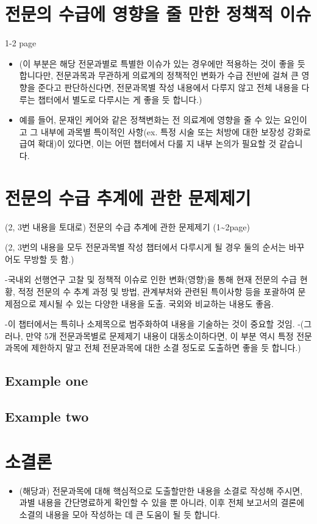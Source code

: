 \documentclass[]{book}
\providecommand{\tightlist}{%
  \setlength{\itemsep}{0pt}\setlength{\parskip}{0pt}}
\begin{document}
\hypertarget{section-7}{%
\chapter{전문의 수급에 영향을 줄 만한 정책적 이슈}\label{section-7}}

1-2 page

\begin{itemize}
\item
  (이 부분은 해당 전문과별로 특별한 이슈가 있는 경우에만 적용하는 것이 좋을 듯 합니다만, 전문과목과 무관하게 의료계의 정책적인 변화가 수급 전반에 걸쳐 큰 영향을 준다고 판단하신다면, 전문과목별 작성 내용에서 다루지 않고 전체 내용을 다루는 챕터에서 별도로 다루시는 게 좋을 듯 합니다.)
\item
  예를 들어, 문재인 케어와 같은 정책변화는 전 의료계에 영향을 줄 수 있는 요인이고 그 내부에 과목별 특이적인 사항(ex. 특정 시술 또는 처방에 대한 보장성 강화로 급여 확대)이 있다면, 이는 어떤 챕터에서 다룰 지 내부 논의가 필요할 것 같습니다.
\end{itemize}

\hypertarget{section-8}{%
\chapter{전문의 수급 추계에 관한 문제제기}\label{section-8}}

(2, 3번 내용을 토대로) 전문의 수급 추계에 관한 문제제기 (1\textasciitilde2page)

(2, 3번의 내용을 모두 전문과목별 작성 챕터에서 다루시게 될 경우 둘의 순서는 바꾸어도 무방할 듯 함.)

-국내외 선행연구 고찰 및 정책적 이슈로 인한 변화(영향)을 통해 현재 전문의 수급 현황, 적정 전문의 수 추계 과정 및 방법, 관계부처와 관련된 특이사항 등을 포괄하여 문제점으로 제시될 수 있는 다양한 내용을 도출. 국외와 비교하는 내용도 좋음.

-이 챕터에서는 특히나 소제목으로 범주화하여 내용을 기술하는 것이 중요할 것임.
-(그러나, 만약 5개 전문과목별로 문제제기 내용이 대동소이하다면, 이 부분 역시 특정 전문과목에 제한하지 말고 전체 전문과목에 대한 소결 정도로 도출하면 좋을 듯 합니다.)

\hypertarget{example-one}{%
\section{Example one}\label{example-one}}

\hypertarget{example-two}{%
\section{Example two}\label{example-two}}

\hypertarget{section-9}{%
\chapter{소결론}\label{section-9}}

\begin{itemize}
\tightlist
\item
  (해당과) 전문과목에 대해 핵심적으로 도출할만한 내용을 소결로 작성해 주시면, 과별 내용을 간단명료하게 확인할 수 있을 뿐 아니라, 이후 전체 보고서의 결론에 소결의 내용을 모아 작성하는 데 큰 도움이 될 듯 합니다.
\end{itemize}


\end{document}
